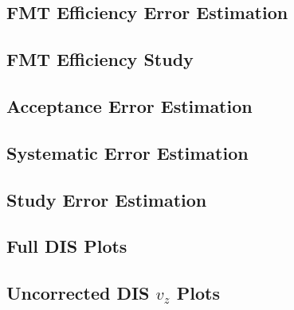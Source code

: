 \subsection*{FMT Efficiency Error Estimation}


\subsection*{FMT Efficiency Study}


\subsection*{Acceptance Error Estimation}


\subsection*{Systematic Error Estimation}


\subsection*{Study Error Estimation}


\subsection*{Full DIS Plots}


\subsection*{Uncorrected DIS $v_z$ Plots}

